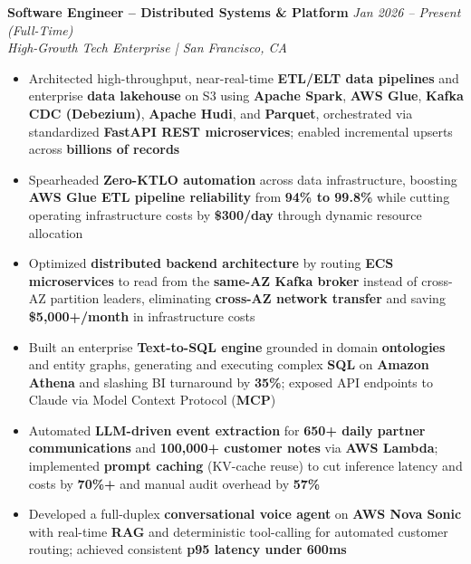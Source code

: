 \documentclass[10pt]{article}
\begin{document}
\textbf{Software Engineer -- Distributed Systems \& Platform} \hfill \textcolor{subheadingcolor}{\textit{Jan 2026 -- Present (Full-Time)}} \\
\textit{High-Growth Tech Enterprise | San Francisco, CA}
\begin{itemize}
    \item Architected high-throughput, near-real-time \textbf{ETL/ELT data pipelines} and enterprise \textbf{data lakehouse} on S3 using \textbf{Apache Spark}, \textbf{AWS Glue}, \textbf{Kafka CDC (Debezium)}, \textbf{Apache Hudi}, and \textbf{Parquet}, orchestrated via standardized \textbf{FastAPI REST microservices}; enabled incremental upserts across \textbf{billions of records}
    \item Spearheaded \textbf{Zero-KTLO automation} across data infrastructure, boosting \textbf{AWS Glue ETL pipeline reliability} from \textbf{94\% to 99.8\%} while cutting operating infrastructure costs by \textbf{\$300/day} through dynamic resource allocation
    \item Optimized \textbf{distributed backend architecture} by routing \textbf{ECS microservices} to read from the \textbf{same-AZ Kafka broker} instead of cross-AZ partition leaders, eliminating \textbf{cross-AZ network transfer} and saving \textbf{\$5,000+/month} in infrastructure costs
    \item Built an enterprise \textbf{Text-to-SQL engine} grounded in domain \textbf{ontologies} and entity graphs, generating and executing complex \textbf{SQL} on \textbf{Amazon Athena} and slashing BI turnaround by \textbf{35\%}; exposed API endpoints to Claude via Model Context Protocol (\textbf{MCP})
    \item Automated \textbf{LLM-driven event extraction} for \textbf{650+ daily partner communications} and \textbf{100,000+ customer notes} via \textbf{AWS Lambda}; implemented \textbf{prompt caching} (KV-cache reuse) to cut inference latency and costs by \textbf{70\%+} and manual audit overhead by \textbf{57\%}
    \item Developed a full-duplex \textbf{conversational voice agent} on \textbf{AWS Nova Sonic} with real-time \textbf{RAG} and deterministic tool-calling for automated customer routing; achieved consistent \textbf{p95 latency under 600ms}
\end{itemize}
\vspace{-0.3em}
\end{document}
